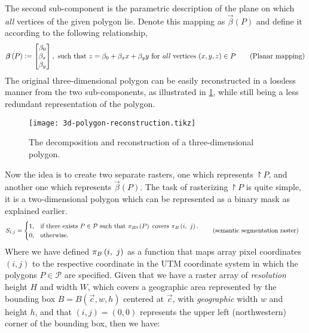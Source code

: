 The second sub-component is the parametric description of the plane on which \emph{all} vertices of the given polygon lie.
Denote this mapping as $\vec{\beta}(P)$ and define it according to the following relationship,
\begin{align}
  \boldsymbol{\beta}\left(P\right)
  \vcentcolon=
  \begin{bmatrix}
    \beta_0 \\
    \beta_x \\
    \beta_y \\
  \end{bmatrix},
  \text{ such that }
  z = \beta_0 + \beta_x x + \beta_y y \text{ for \emph{all} vertices } (x, y, z) \in P
  \tag{Planar mapping}\label{eq:planar}
\end{align}
The original three-dimensional polygon can be easily reconstructed in a lossless manner from the two sub-components, as illustrated in \cref{fig:3d-polygon-reconstruction}, while still being a less redundant representation of the polygon.
%
\begin{figure}[H]
  \centering
  \texttt{[image: 3d-polygon-reconstruction.tikz]}
  \caption{%
    The decomposition and reconstruction of a three-dimensional polygon.
  }%
  \label{fig:3d-polygon-reconstruction}
\end{figure}
\noindent
Now the idea is to create two separate rasters, one which represents $\project{P}$, and another one which represents $\vec{\beta}(P)$.
The task of rasterizing $\project{P}$ is quite simple, it is a two-dimensional polygon which can be represented as a binary mask as explained earlier.
\begin{align*}
  S_{i,j} &= \begin{cases}
    1, &\text{if there exists } P \in \mathcal{P} \text{ such that } \pi_{\mathrm{2D}}\left(P\right) \text{ covers } \pi_{B}\left(i,~j\right).\\
    0, &\text{otherwise.}
  \end{cases}
  \tag{semantic segmentation raster}
\end{align*}
Where we have defined $\pi_{B}\left(i,~j\right)$ as a function that maps array pixel coordinates $(i, j)$ to the respective coordinate in the UTM coordinate system in which the polygons $P \in \mathcal{P}$ are specified.
Given that we have a raster array of \emph{resolution} height $H$ and width $W$, which covers a geographic area represented by the bounding box $B = B(\vec{c}, w, h)$ centered at $\vec{c}$, with \emph{geographic} width $w$ and height $h$, and that $(i, j) = (0, 0)$ represents the upper left (northwestern) corner of the bounding box, then we have:
